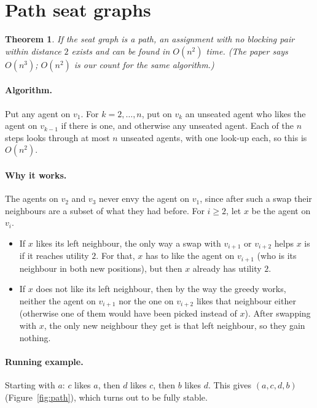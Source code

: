 \documentclass[11pt,a4paper]{article}
\newtheorem{theorem}{Theorem}
\theoremstyle{definition}
\theoremstyle{remark}
\theoremstyle{plain}
\begin{document}
\section{Path seat graphs}\label{sec:pathsec}

\begin{theorem}\label{thm:path}
If the seat graph is a path, an assignment with no blocking pair within distance $2$ exists and can be found in $O(n^2)$ time. (The paper says $O(n^3)$; $O(n^2)$ is our count for the same algorithm.)
\end{theorem}

\paragraph{Algorithm.} Put any agent on $v_1$. For $k=2,\dots,n$, put on $v_k$ an unseated agent who likes the agent on $v_{k-1}$ if there is one, and otherwise any unseated agent. Each of the $n$ steps looks through at most $n$ unseated agents, with one look-up each, so this is $O(n^2)$.

\paragraph{Why it works.} The agents on $v_2$ and $v_3$ never envy the agent on $v_1$, since after such a swap their neighbours are a subset of what they had before. For $i\ge2$, let $x$ be the agent on $v_i$.
\begin{itemize}
  \item If $x$ likes its left neighbour, the only way a swap with $v_{i+1}$ or $v_{i+2}$ helps $x$ is if it reaches utility $2$. For that, $x$ has to like the agent on $v_{i+1}$ (who is its neighbour in both new positions), but then $x$ already has utility $2$.
  \item If $x$ does not like its left neighbour, then by the way the greedy works, neither the agent on $v_{i+1}$ nor the one on $v_{i+2}$ likes that neighbour either (otherwise one of them would have been picked instead of $x$). After swapping with $x$, the only new neighbour they get is that left neighbour, so they gain nothing.
\end{itemize}

\paragraph{Running example.} Starting with $a$: $c$ likes $a$, then $d$ likes $c$, then $b$ likes $d$. This gives $(a,c,d,b)$ (Figure~\ref{fig:path}), which turns out to be fully stable.
\end{document}
